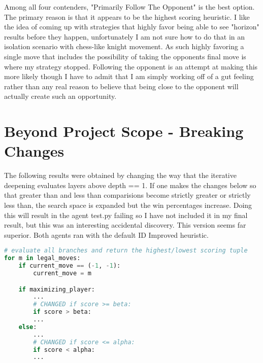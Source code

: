 \documentclass[10pt, a4paper]{article}
\begin{document}
Among all four contenders, "Primarily Follow The Opponent" is the best option.  The primary
reason is that it appears to be the highest scoring heuristic.  I like the idea of coming up
with strategies that highly favor being able to see "horizon" results before they happen, unfortunately
I am not sure how to do that in an isolation scenario with chess-like knight movement.  As such
highly favoring a single move that includes the possibility of taking the opponents final move
is where my strategy stopped.  Following the opponent is an attempt at making this more likely
though I have to admit that I am simply working off of a gut feeling rather than any real reason
to believe that being close to the opponent will actually create such an opportunity.

\section{Beyond Project Scope - Breaking Changes}

The following results were obtained by changing the way that the iterative deepening
evaluates layers above depth == 1.  If one makes the changes below so that greater than and
less than comparisions become strictly greater or strictly less than, the search space is
expanded but the win percentages increase.  Doing this will result in the agent test.py
failing so I have not included it in my final result, but this was an interesting accidental
discovery.  This version seems far superior.  Both agents ran with the default ID Improved heuristic.

\begin{lstlisting}[language=Python]
# evaluate all branches and return the highest/lowest scoring tuple
for m in legal_moves:
	if current_move == (-1, -1):
		current_move = m

	if maximizing_player:
		...
		# CHANGED if score >= beta:
		if score > beta:
		...
	else:	
		...
		# CHANGED if score <= alpha:
		if score < alpha:
		...
\end{lstlisting}
\end{document}
